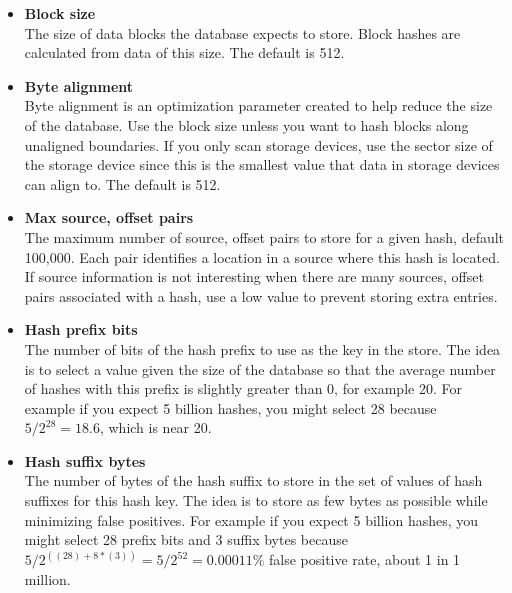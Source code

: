 \documentclass[11pt,fleqn]{article} %
\begin{document}
\begin{itemize}
\item \textbf{Block size}\\
The size of data blocks the database expects to store. Block hashes are calculated from data of this size. The default is 512.\\

\item \textbf{Byte alignment}\\
Byte alignment is an optimization parameter created to help reduce the size of the database. Use the block size unless you want to hash blocks along unaligned boundaries. If you only scan storage devices, use the sector size of the storage device since this is the smallest value that data in storage devices can align to. The default is 512.\\

\item \textbf{Max source, offset pairs}\\
The maximum number of source, offset pairs to store for a given hash, default 100,000. Each pair identifies a location in a source where this hash is located. If source information is not interesting when there are many sources, offset pairs associated with a hash, use a low value to prevent storing extra entries.\\

\item \textbf{Hash prefix bits}\\
The number of bits of the hash prefix to use as the key in the store. The idea is to select a value given the size of the database so that the average number of hashes with this prefix is slightly greater than 0, for example 20. For example if you expect 5 billion hashes, you might select 28 because $5/2^{28}=18.6$, which is near 20.\\

\item \textbf{Hash suffix bytes}\\
The number of bytes of the hash suffix to store in the set of values of hash suffixes for this hash key. The idea is to store as few bytes as possible while minimizing false positives. For example if you expect 5 billion hashes, you might select 28 prefix bits and 3 suffix bytes because $5 / 2^{((28) + 8*(3))} = 5 / 2^{52} = 0.00011\%$ false positive rate, about 1 in 1 million.\\
\end{itemize}
\end{document}
